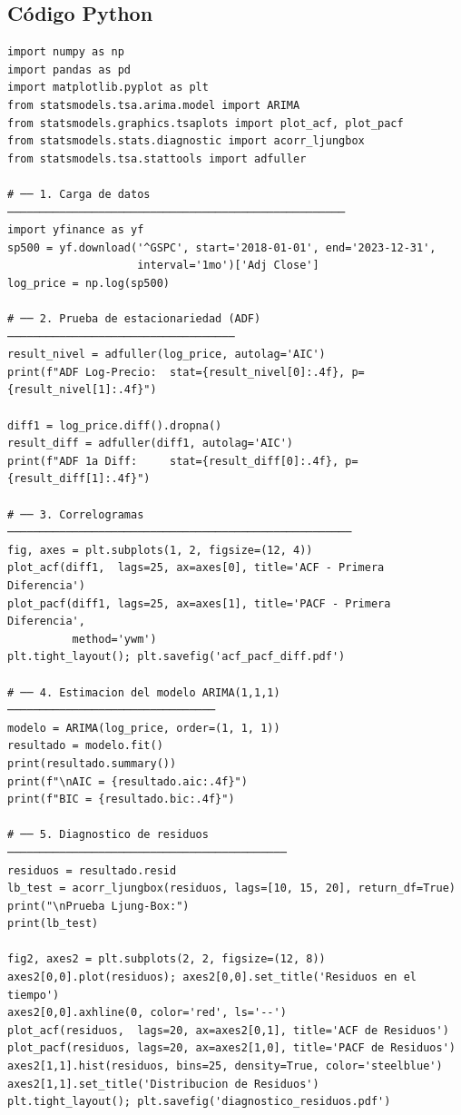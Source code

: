 \documentclass[12pt,a4paper]{article}
\begin{document}
\subsection{C\'{o}digo Python}

\begin{lstlisting}[caption={Ejemplo 1 --- ARIMA(1,1,1) con statsmodels},
                   label={lst:arima111}]
import numpy as np
import pandas as pd
import matplotlib.pyplot as plt
from statsmodels.tsa.arima.model import ARIMA
from statsmodels.graphics.tsaplots import plot_acf, plot_pacf
from statsmodels.stats.diagnostic import acorr_ljungbox
from statsmodels.tsa.stattools import adfuller

# ── 1. Carga de datos ────────────────────────────────────────────────────
import yfinance as yf
sp500 = yf.download('^GSPC', start='2018-01-01', end='2023-12-31',
                    interval='1mo')['Adj Close']
log_price = np.log(sp500)

# ── 2. Prueba de estacionariedad (ADF) ───────────────────────────────────
result_nivel = adfuller(log_price, autolag='AIC')
print(f"ADF Log-Precio:  stat={result_nivel[0]:.4f}, p={result_nivel[1]:.4f}")

diff1 = log_price.diff().dropna()
result_diff = adfuller(diff1, autolag='AIC')
print(f"ADF 1a Diff:     stat={result_diff[0]:.4f}, p={result_diff[1]:.4f}")

# ── 3. Correlogramas ─────────────────────────────────────────────────────
fig, axes = plt.subplots(1, 2, figsize=(12, 4))
plot_acf(diff1,  lags=25, ax=axes[0], title='ACF - Primera Diferencia')
plot_pacf(diff1, lags=25, ax=axes[1], title='PACF - Primera Diferencia',
          method='ywm')
plt.tight_layout(); plt.savefig('acf_pacf_diff.pdf')

# ── 4. Estimacion del modelo ARIMA(1,1,1) ────────────────────────────────
modelo = ARIMA(log_price, order=(1, 1, 1))
resultado = modelo.fit()
print(resultado.summary())
print(f"\nAIC = {resultado.aic:.4f}")
print(f"BIC = {resultado.bic:.4f}")

# ── 5. Diagnostico de residuos ───────────────────────────────────────────
residuos = resultado.resid
lb_test = acorr_ljungbox(residuos, lags=[10, 15, 20], return_df=True)
print("\nPrueba Ljung-Box:")
print(lb_test)

fig2, axes2 = plt.subplots(2, 2, figsize=(12, 8))
axes2[0,0].plot(residuos); axes2[0,0].set_title('Residuos en el tiempo')
axes2[0,0].axhline(0, color='red', ls='--')
plot_acf(residuos,  lags=20, ax=axes2[0,1], title='ACF de Residuos')
plot_pacf(residuos, lags=20, ax=axes2[1,0], title='PACF de Residuos')
axes2[1,1].hist(residuos, bins=25, density=True, color='steelblue')
axes2[1,1].set_title('Distribucion de Residuos')
plt.tight_layout(); plt.savefig('diagnostico_residuos.pdf')


\end{lstlisting}
\end{document}
